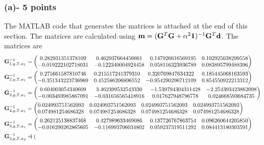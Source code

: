 \documentclass[11pt]{article}
\begin{document}
\subsubsection*{(a)- 5 points}
The MATLAB code that generates the matrices is attached at the end of this section. The matrices are calculated using $\mathbf{m} = (\mathbf{G}^T\mathbf{G} + \alpha^2 \mathbf{1})^{-1} \mathbf{G}^T \mathbf{d}$.
The matrices are
\begin{subequations}
\begin{align}
\nonumber\mathbf{G}_{1,g,T,\alpha_1}^{-1} &= 
\begin{pmatrix} 
0.282931351378109  & 0.462937664456661 &  0.147926616569195 & 0.102925038299558\\
-0.019222102718031 & -0.122340004924458  & 0.058116323936789 & 0.083895799488396   
\end{pmatrix}\\
\nonumber\mathbf{G}_{2,g,T,\alpha_1}^{-1} &= 
\begin{pmatrix}
   0.275661587810746 &  0.215517241379310 &  0.320769847634322 &  0.185445068163593\\
  -0.351343223736969 &  0.452586206896552 & -0.954290296712109 &  0.854550922213312
\end{pmatrix}\\
\nonumber\mathbf{G}_{3,g,T,\alpha_1}^{-1} &= 
\begin{pmatrix}
   0.604003054340609  & 3.462399532543330  &-1.539794304311428 & -2.254393423862098\\
  -0.003493985867091 & -0.031656565418916 &  0.017627948796778 &  0.024668593684735
\end{pmatrix}\\
\nonumber\mathbf{G}_{4,g,T,\alpha_1}^{-1} &= 
\begin{pmatrix}
   0.024993751562093 &  0.024993751562093 &  0.024993751562093  & 0.024993751562093\\
   0.074981254686328  & 0.074981254686328 &  0.074981254686328 &  0.074981254686328
\end{pmatrix}\\
\nonumber\mathbf{G}_{3,g,T,\alpha_1}^{-1} &= 
\begin{pmatrix}
   0.262125138837468  & 0.427989633469086  & 0.137726767863754  & 0.096260644205850\\
  -0.016290262865605 & -0.116993706034802 &  0.059237319511292 &  0.084413180303591
\end{pmatrix}\\
\nonumber\mathbf{G}_{3,g,T,\alpha_2}^{-1} &= 
\begin{pmatrix}

\end{pmatrix}
\end{align}
\end{subequations}
\end{document}
